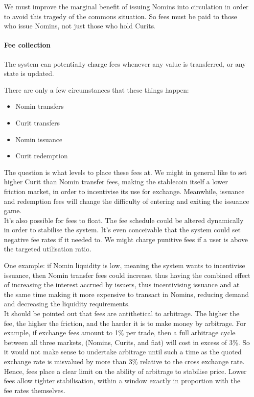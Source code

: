 \documentclass{article}
\begin{document}
We must improve the marginal benefit of issuing Nomins into circulation in order to avoid this tragedy of the commons situation. So fees must be paid to those who issue Nomins, not just those who hold Curits.

\paragraph{Fee collection}

The system can potentially charge fees whenever any value is transferred, or any state is updated.

There are only a few circumstances that these things happen:

\begin{itemize}
    \item Nomin transfers
    \item Curit transfers
    \item Nomin issuance
    \item Curit redemption
\end{itemize}

The question is what levels to place these fees at. We might in general like to set higher Curit than Nomin transfer fees, making the stablecoin itself a lower friction market, in order to incentivise its use for exchange. Meanwhile, issuance and redemption fees will change the difficulty of entering and exiting the issuance game. \\

It's also possible for fees to float. The fee schedule could be altered dynamically in order to stabilise the system. It's even conceivable that the system could set negative fee rates if it needed to. We might charge punitive fees if a user is above the targeted utilisation ratio.

One example: if Nomin liquidity is low, meaning the system wants to incentivise issuance, then Nomin transfer fees could increase, thus having the combined effect of increasing the interest accrued by issuers, thus incentivising issuance and at the same time making it more expensive to transact in Nomins,
reducing demand and decreasing the liquidity requirements. \\

It should be pointed out that fees are antithetical to arbitrage. The higher the fee, the higher the friction, and the harder it is to make money by arbitrage. For example, if exchange fees amount to 1\% per trade, then a full arbitrage cycle between all three markets, (Nomins, Curits, and fiat) will cost in excess of 3\%. So it would not make sense to undertake arbitrage until such a time as the quoted exchange rate is misvalued by more than 3\% relative to the cross exchange rate. Hence, fees place a clear limit on the ability of arbitrage to stabilise price. Lower fees allow tighter stabilisation, within a window exactly in proportion with the fee rates themselves.
\end{document}
